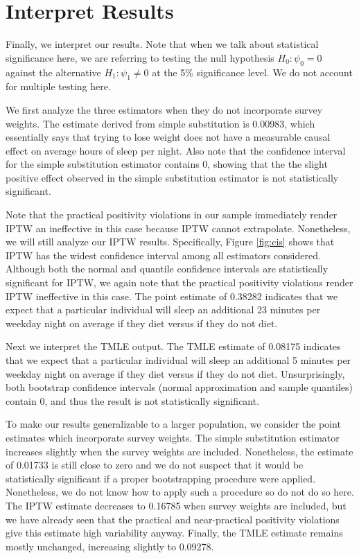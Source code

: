 \documentclass{article}
\begin{document}
\section{Interpret Results}
Finally, we interpret our results. Note that when we talk about statistical significance here, we are referring to testing the null hypothesis $H_0 : \psi_0 = 0$ against the alternative $H_1 : \psi_1\not=0$ at the 5\% significance level. We do not account for multiple testing here.

We first analyze the three estimators when they do not incorporate survey weights. The estimate derived from simple substitution is 0.00983, which essentially says that trying to lose weight does not have a measurable causal effect on average hours of sleep per night. Also note that the confidence interval for the simple substitution estimator contains $0$, showing that the the slight positive effect observed in the simple substitution estimator is not statistically significant.

Note that the practical positivity violations in our sample immediately render IPTW an ineffective in this case because IPTW cannot extrapolate. Nonetheless, we will still analyze our IPTW results. Specifically, Figure \ref{fig:cis} shows that IPTW has the widest confidence interval among all estimators considered. Although both the normal and quantile confidence intervals are statistically significant for IPTW, we again note that the practical positivity violations render IPTW ineffective in this case. The point estimate of 0.38282 indicates that we expect that a particular individual will sleep an additional 23 minutes per weekday night on average if they diet versus if they do not diet.

Next we interpret the TMLE output. The TMLE estimate of 0.08175 indicates that we expect that a particular individual will sleep an additional 5 minutes per weekday night on average if they diet versus if they do not diet. Unsurprisingly, both bootstrap confidence intervals (normal approximation and sample quantiles) contain $0$, and thus the result is not statistically significant.

To make our results generalizable to a larger population, we consider the point estimates which incorporate survey weights. The simple substitution estimator increases slightly when the survey weights are included. Nonetheless, the estimate of 0.01733 is still close to zero and we do not suspect that it would be statistically significant if a proper bootstrapping procedure were applied. Nonetheless, we do not know how to apply such a procedure so do not do so here. The IPTW estimate decreases to 0.16785 when survey weights are included, but we have already seen that the practical and near-practical positivity violations give this estimate high variability anyway. Finally, the TMLE estimate remains mostly unchanged, increasing slightly to 0.09278. 
\end{document}
